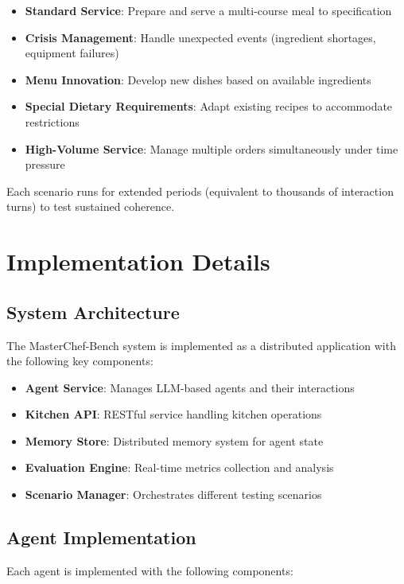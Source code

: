\documentclass{article}
\begin{document}
\begin{itemize}
    \item \textbf{Standard Service}: Prepare and serve a multi-course meal to specification
    \item \textbf{Crisis Management}: Handle unexpected events (ingredient shortages, equipment failures)
    \item \textbf{Menu Innovation}: Develop new dishes based on available ingredients
    \item \textbf{Special Dietary Requirements}: Adapt existing recipes to accommodate restrictions
    \item \textbf{High-Volume Service}: Manage multiple orders simultaneously under time pressure
\end{itemize}

Each scenario runs for extended periods (equivalent to thousands of interaction turns) to test sustained coherence.

\section{Implementation Details}
\label{sec:implementation}

\subsection{System Architecture}

The MasterChef-Bench system is implemented as a distributed application with the following key components:

\begin{itemize}
    \item \textbf{Agent Service}: Manages LLM-based agents and their interactions
    \item \textbf{Kitchen API}: RESTful service handling kitchen operations
    \item \textbf{Memory Store}: Distributed memory system for agent state
    \item \textbf{Evaluation Engine}: Real-time metrics collection and analysis
    \item \textbf{Scenario Manager}: Orchestrates different testing scenarios
\end{itemize}

\subsection{Agent Implementation}
Each agent is implemented with the following components:
\end{document}
